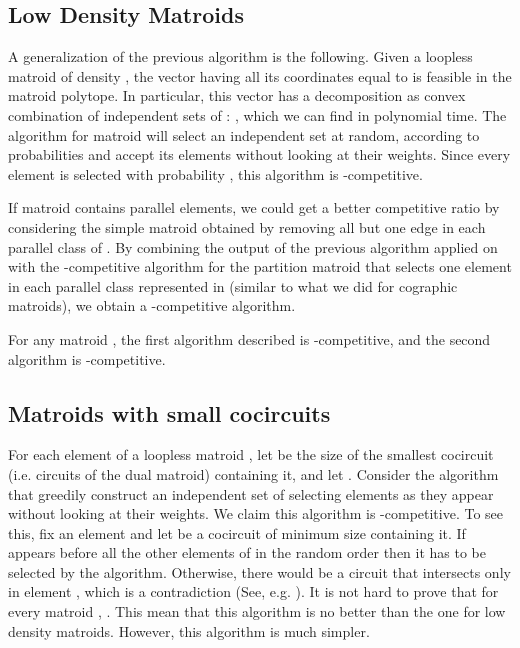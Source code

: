 \documentclass[letterpaper,11pt]{article}
\theoremstyle{definition}
\theoremstyle{remark}
\begin{document}
\subsection{Low Density Matroids}
A generalization of the previous algorithm is the following. Given a loopless matroid  of density , the vector  having all its coordinates equal to  is feasible in the matroid polytope. In particular, this vector has a decomposition as convex combination of independent sets of : , which we can find in polynomial time. The algorithm for matroid  will select an independent set  at random, according to probabilities  and accept its elements without looking at their weights. Since every element  is selected with probability , this algorithm is -competitive.

If matroid  contains parallel elements, we could get a better competitive ratio by considering the simple matroid  obtained by removing all but one edge in each parallel class of . By combining the output  of the previous algorithm applied on  with the -competitive algorithm for the partition matroid that selects one element in each parallel class represented in  (similar to what we did for cographic matroids), we obtain a -competitive algorithm.

\begin{thm} For any matroid , the first algorithm described is -competitive, and the second algorithm is -competitive.
\end{thm}

\subsection{Matroids with small cocircuits}
For each element  of a loopless matroid , let  be the size of the smallest cocircuit (i.e. circuits of the dual matroid) containing it, and let . Consider the algorithm that greedily construct an independent set of  selecting elements as they appear without looking at their weights. We claim this algorithm is -competitive. To see this, fix an element  and let  be a cocircuit of minimum size containing it. If  appears before all the other elements of  in the random order then it has to be selected by the algorithm. Otherwise, there would be a circuit  that intersects  only in element , which is a contradiction (See, e.g. \cite[Proposition 2.1.11]{oxley2006matroid}). It is not hard to prove that for every matroid , . This mean that this algorithm is no better than the one for low density matroids. However, this algorithm is much simpler.
\end{document}
